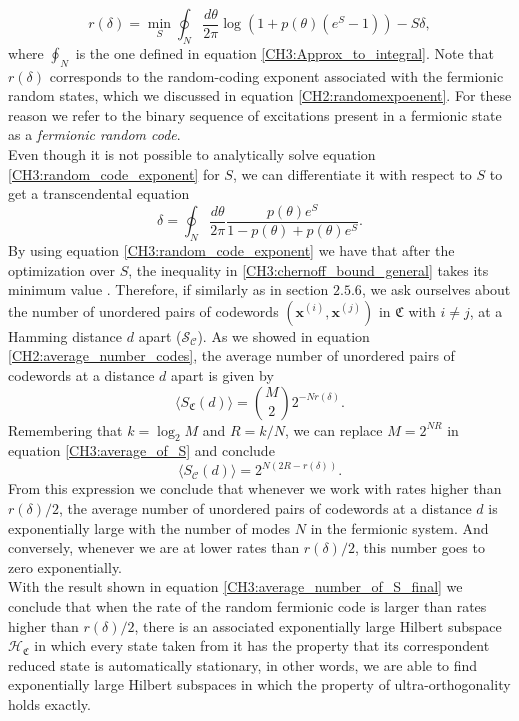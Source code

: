 \begin{equation}
r(\delta)=\min_{S}\oint_{N} \frac{d\theta}{2\pi}\log\left(1+p(\theta)(e^S -1)\right) -S\delta,
\label{CH3:random_code_exponent}
\end{equation}
where $\oint_{N}$ is the one defined in equation \eqref{CH3:Approx_to_integral}. Note that $r(\delta)$ corresponds to the random-coding exponent associated with the fermionic random states, which we discussed in equation \eqref{CH2:randomexpoenent}. For these reason we refer to the binary sequence of excitations present in a fermionic state as a \textit{fermionic random code}.\\
\indent Even though it is not possible to analytically solve equation \eqref{CH3:random_code_exponent} for $S$, we can differentiate it with respect to $S$ to get a transcendental equation
\begin{equation}
\delta = \oint_N \frac{d\theta}{2\pi} \frac{p(\theta)e^{S}}{1-p(\theta) + p(\theta)e^S}.
\label{CH:optimizing_code_exponent}
\end{equation}
By using equation \eqref{CH3:random_code_exponent} we have that after the optimization over $S$, the inequality in \eqref{CH3:chernoff_bound_general} takes its minimum value \cite{barg_random_2002}. Therefore, if similarly as in section $2.5.6$, we ask ourselves about the number of unordered pairs of codewords $(\mathbf{x}^{(i)},\mathbf{x}^{(j)})$ in $\mathfrak{C}$ with $i\neq j$, at a Hamming distance $d$ apart ($\mathcal{S}_{\mathcal{C}}$). As we showed in equation \eqref{CH2:average_number_codes}, the average number of unordered pairs of codewords  at a distance $d$ apart is given by
\begin{equation}
\langle S_{\mathfrak{C}}(d)\rangle = {M \choose 2} 2^{-Nr(\delta)}.
\label{CH3:average_of_S}
\end{equation}
Remembering that $k=\log_{2} M$ and $R=k/N$, we can replace $M= 2^{NR}$ in equation \eqref{CH3:average_of_S} and conclude
\begin{equation}
\langle S_{\mathcal{C}}(d)\rangle =  2^{N(2R-r(\delta))}.
\label{CH3:average_number_of_S_final}
\end{equation}
From this expression we conclude that whenever we work with rates higher than $r(\delta)/2$, the average number of unordered pairs of codewords at a distance $d$ is exponentially large with the number of modes $N$ in the fermionic system. And conversely, whenever we are at lower rates than $r(\delta)/2$, this number goes to zero exponentially.\\
With the result shown in equation \eqref{CH3:average_number_of_S_final} we conclude that when the rate of the random fermionic code is larger than rates higher than $r(\delta)/2$, there is an associated exponentially large Hilbert subspace $\mathcal{H}_{\mathfrak{C}}$ in which every state taken from it has the property that its correspondent reduced state is automatically stationary, in other words, we are able to find exponentially large Hilbert subspaces in which the property of ultra-orthogonality holds exactly.